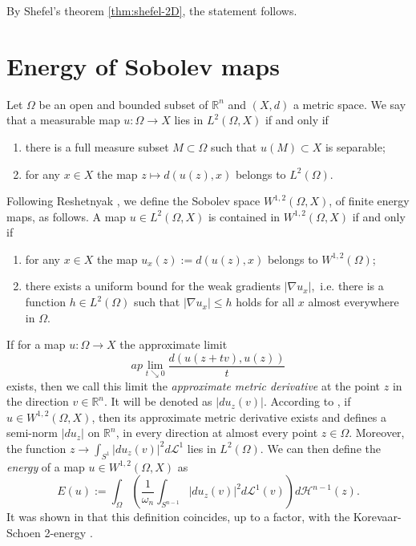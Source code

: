 \documentclass[a4paper,10pt]{amsart}
\begin{document}
By Shefel's theorem \ref{thm:shefel-2D}, the statement follows.\qeds

\section{Energy of Sobolev maps}


Let $\Omega$ be an open and bounded subset of $\mathbb{R}^n$ and $(X,d)$ a metric space.
We say that a measurable map $u:\Omega\to X$ lies in 
$L^2(\Omega,X)$ if and only if
\begin{enumerate}
 \item there is a full measure subset $M\subset \Omega$ such that $u(M)\subset X$ is separable;
 \item for any $x\in X$ the map $z\mapsto d(u(z),x)$ belongs to $L^2(\Omega)$.
\end{enumerate}

Following Reshetnyak \cite{R}, we define the Sobolev space $W^{1,2}(\Omega,X)$, of finite energy maps, as follows. 
A map $u\in L^2(\Omega,X)$ is contained in $W^{1,2}(\Omega,X)$ if and only if

\begin{enumerate}
 \item for any $x\in X$ the map $u_x(z):=d(u(z),x)$ belongs to $W^{1,2}(\Omega)$;
 \item there exists a uniform bound for the weak gradients $|\nabla u_x|$,\ i.e. there is a function $h\in L^2(\Omega)$ 
 such that $|\nabla u_x|\leq h$ holds for all $x$ almost everywhere in $\Omega$. 
\end{enumerate}

If for a map $u:\Omega\to X$ the  approximate limit
$$
ap\lim_{t\searrow 0}\frac{d(u(z+tv),u(z))}{t}
$$
exists, then we call this limit the {\em approximate metric derivative} at the point $z$ in the direction $v\in\mathbb{R}^n$. It will be denoted
as $|du_z(v)|$. According to
\cite[Prop.4.3]{LW}, if $u\in W^{1,2}(\Omega,X)$, then its approximate metric derivative exists and defines a semi-norm $|du_z|$ on $\mathbb{R}^n$, 
in every direction at almost every point $z\in\Omega$. Moreover, the function $z\to\int_{S^1}|du_z(v)|^2 d\mathcal{L}^1$ lies in $L^2(\Omega)$.
We can then define the {\em energy} of a map $u\in W^{1,2}(\Omega,X)$ as
$$
E(u):=\int_\Omega\left(\frac{1}{\omega_n}\int_{S^{n-1}}|du_z(v)|^2 d\mathcal{L}^1(v)\right)d\mathcal{H}^{n-1}(z).
$$
It was shown in \cite{LW} that this definition coincides, up to a factor, with the Korevaar-Schoen 2-energy \cite{KS}.
\end{document}
